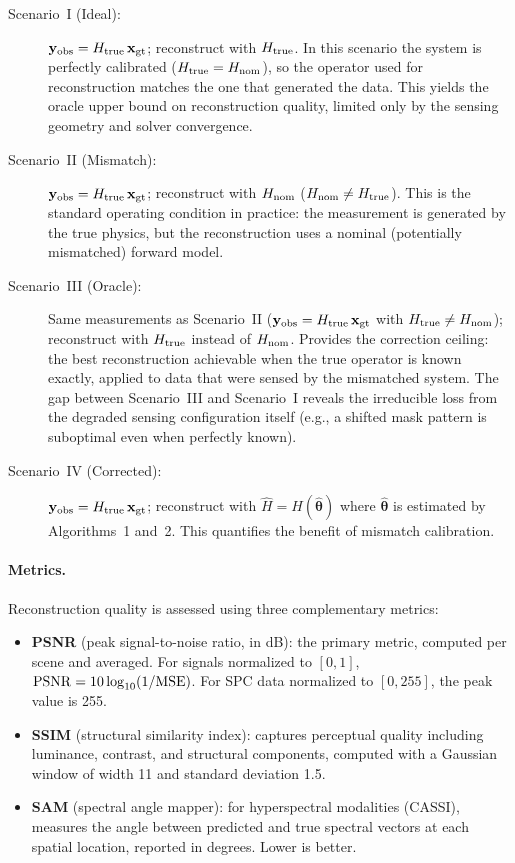 \begin{description}
  \item[Scenario~I (Ideal):]
    $\mathbf{y}_{\mathrm{obs}} = H_{\mathrm{true}}\, \mathbf{x}_{\mathrm{gt}}$; reconstruct with $H_{\mathrm{true}}$.
    In this scenario the system is perfectly calibrated ($H_{\mathrm{true}} = H_{\mathrm{nom}}$),
    so the operator used for reconstruction matches the one that generated
    the data.  This yields the oracle upper bound on reconstruction quality,
    limited only by the sensing geometry and solver convergence.
  \item[Scenario~II (Mismatch):]
    $\mathbf{y}_{\mathrm{obs}} = H_{\mathrm{true}}\, \mathbf{x}_{\mathrm{gt}}$; reconstruct with $H_{\mathrm{nom}}$
    ($H_{\mathrm{nom}} \neq H_{\mathrm{true}}$).
    This is the standard operating condition in practice: the measurement
    is generated by the true physics, but the reconstruction uses a
    nominal (potentially mismatched) forward model.
  \item[Scenario~III (Oracle):]
    Same measurements as Scenario~II
    ($\mathbf{y}_{\mathrm{obs}} = H_{\mathrm{true}}\, \mathbf{x}_{\mathrm{gt}}$ with $H_{\mathrm{true}} \neq H_{\mathrm{nom}}$);
    reconstruct with $H_{\mathrm{true}}$ instead of $H_{\mathrm{nom}}$.
    Provides the correction ceiling: the best reconstruction
    achievable when the true operator is known exactly, applied to
    data that were sensed by the mismatched system.  The gap between
    Scenario~III and Scenario~I reveals the irreducible loss from
    the degraded sensing configuration itself (e.g., a shifted mask
    pattern is suboptimal even when perfectly known).
  \item[Scenario~IV (Corrected):]
    $\mathbf{y}_{\mathrm{obs}} = H_{\mathrm{true}}\, \mathbf{x}_{\mathrm{gt}}$; reconstruct with
    $\hat{H} = H(\hat{\boldsymbol{\theta}})$ where
    $\hat{\boldsymbol{\theta}}$ is estimated by Algorithms~1 and~2.
    This quantifies the benefit of mismatch calibration.
\end{description}

\paragraph{Metrics.}
Reconstruction quality is assessed using three complementary metrics:
\begin{itemize}
  \item \textbf{PSNR} (peak signal-to-noise ratio, in dB): the primary
    metric, computed per scene and averaged.  For signals normalized to
    $[0, 1]$, $\mathrm{PSNR} = 10 \log_{10}(1 / \text{MSE})$.  For SPC data
    normalized to $[0, 255]$, the peak value is 255.
  \item \textbf{SSIM} (structural similarity index): captures perceptual
    quality including luminance, contrast, and structural components,
    computed with a Gaussian window of width 11 and standard deviation
    1.5.
  \item \textbf{SAM} (spectral angle mapper): for hyperspectral
    modalities (CASSI), measures the angle between predicted and true
    spectral vectors at each spatial location, reported in degrees.
    Lower is better.
\end{itemize}

